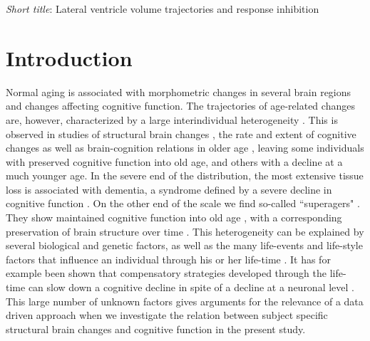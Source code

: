 \documentclass[10pt,letterpaper]{article}
\begin{document}
\emph{Short title}: Lateral ventricle volume trajectories and response inhibition \\


\newpage

\section{Introduction}
\linenumbers
Normal aging is associated with morphometric changes in several brain regions
and changes affecting cognitive function. The trajectories of age-related changes are, however, characterized by a large interindividual heterogeneity \cite{Nyberg2012}.  This is observed in studies of structural brain changes \cite{Fjell2013}, the rate and extent of cognitive changes \cite{Goh2012,Reuter-Lorenz2014} as well as brain-cognition relations in older age \cite{Nyberg2017,Vidal-Pineiro2018}, leaving some individuals with preserved cognitive function into old age, and others with a decline at a much younger age. In the severe end of the distribution, the most extensive tissue loss is associated with dementia, a syndrome defined by a severe decline in cognitive function \cite{Gale2018}. On the other end of the scale we find so-called ``superagers" \cite{Rogalski2013}. They show maintained cognitive function into old age \cite{Borelli2018}, with a corresponding preservation of brain structure over time \cite{Tampubolon2015, Nyberg2017}. This heterogeneity can be explained by several biological and genetic factors, as well as the many life-events and life-style factors that influence an individual through his or her life-time  \cite{Walhovd2014,Nyberg2019,Cabeza2018}. It has for example been shown that compensatory strategies developed through the life-time can slow down a cognitive decline in spite of a decline at a neuronal level \cite{Reuter-Lorenz2014}. This large number of unknown factors gives arguments for the relevance of a data driven approach when we investigate the relation between subject specific structural brain changes and cognitive function in the present study. 
\end{document}
